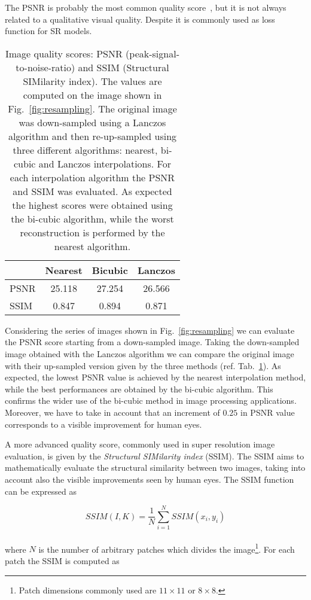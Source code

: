 \documentclass{standalone}
\begin{document}
The PSNR is probably the most common quality score~\cite{psnr_ssim}, but it is not always related to a qualitative visual quality.
Despite it is commonly used as loss function for SR models.

\begin{table}[htbp]
\centering
\begin{tabular}{lccc}
\hline \rowcolor{darkgrayrow}
         & Nearest       & Bicubic        & Lanczos  \\
\hline
PSNR     & 25.118        & 27.254         & 26.566   \\
SSIM     &  0.847        &  0.894         &  0.871   \\
\hline
\end{tabular}
\caption{Image quality scores: PSNR (peak-signal-to-noise-ratio) and SSIM (Structural SIMilarity index).
The values are computed on the image shown in Fig.~\ref{fig:resampling}.
The original image was down-sampled using a Lanczos algorithm and then re-up-sampled using three different algorithms: nearest, bi-cubic and Lanczos interpolations.
For each interpolation algorithm the PSNR and SSIM was evaluated.
As expected the highest scores were obtained using the bi-cubic algorithm, while the worst reconstruction is performed by the nearest algorithm.
}
\label{tab:psnr}
\end{table}

Considering the series of images shown in Fig.~\ref{fig:resampling} we can evaluate the PSNR score starting from a down-sampled image.
Taking the down-sampled image obtained with the Lanczos algorithm we can compare the original image with their up-sampled version given by the three methods (ref. Tab.~\ref{tab:psnr}).
As expected, the lowest PSNR value is achieved by the nearest interpolation method, while the best performances are obtained by the bi-cubic algorithm.
This confirms the wider use of the bi-cubic method in image processing applications.
Moreover, we have to take in account that an increment of $0.25$ in PSNR value corresponds to a visible improvement for human eyes.

A more advanced quality score, commonly used in super resolution image evaluation, is given by the \emph{Structural SIMilarity index} (SSIM).
The SSIM aims to mathematically evaluate the structural similarity between two images, taking into account also the visible improvements seen by human eyes.
The SSIM function can be expressed as

\begin{equation}
SSIM(I, K) = \frac{1}{N}\sum_{i=1}^{N} SSIM(x_{i}, y_{i})
\end{equation}
\\
where $N$ is the number of arbitrary patches which divides the image\footnote{
  Patch dimensions commonly used are $11\times11$ or $8\times8$.
}.
For each patch the SSIM is computed as
\end{document}
